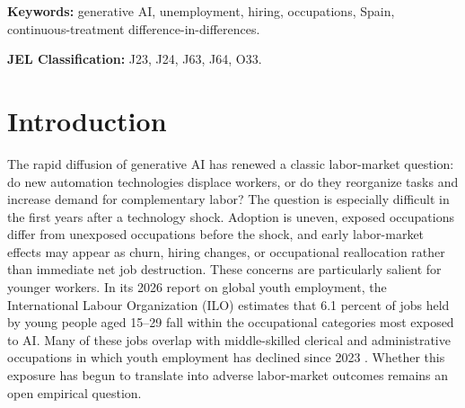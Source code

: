 \maketitle

\begin{abstract}
This paper provides early occupation-level evidence on whether labor-market outcomes in Spain have begun to diverge according to exposure to generative AI. We combine administrative records for 502 four-digit occupations through March 2026 with an exposure measure based on observed AI use. A continuous-treatment difference-in-differences (DiD) design compares occupations within broad occupational families in each month following ChatGPT's November 2022 release. A 10 percentage-point increase in exposure is associated with 1.2 percent more registered unemployment during the first 25 months and 1.7 percent thereafter, although the later estimate is imprecise. The unemployment gradient emerges gradually rather than as an immediate post-release break, while new contracts show no persistent response. These patterns provide early evidence of differential labor-market adjustment across occupations with different exposure to generative AI.
\end{abstract}

\noindent \textbf{Keywords:} generative AI, unemployment, hiring, occupations, Spain,\linebreak
continuous-treatment difference-in-differences.

\noindent \textbf{JEL Classification:} J23, J24, J63, J64, O33.

\section{Introduction}
\label{sec:introduction}

The rapid diffusion of generative AI has renewed a classic labor-market question: do new automation technologies displace workers, or do they reorganize tasks and increase demand for complementary labor? The question is especially difficult in the first years after a technology shock. Adoption is uneven, exposed occupations differ from unexposed occupations before the shock, and early labor-market effects may appear as churn, hiring changes, or occupational reallocation rather than immediate net job destruction. These concerns are particularly salient for younger workers. In its 2026 report on global youth employment, the International Labour Organization (ILO) estimates that 6.1 percent of jobs held by young people aged 15--29 fall within the occupational categories most exposed to AI. Many of these jobs overlap with middle-skilled clerical and administrative occupations in which youth employment has declined since 2023 \citep{ilo_youth_2026}. Whether this exposure has begun to translate into adverse labor-market outcomes remains an open empirical question.

